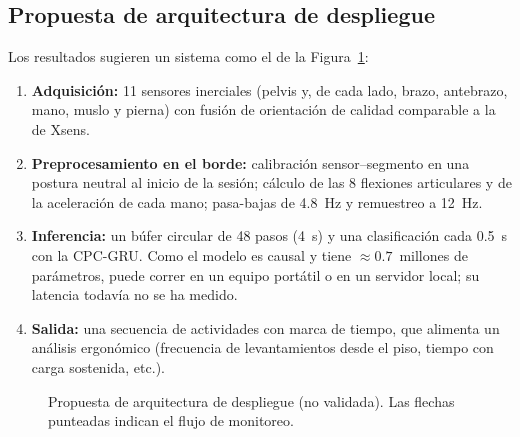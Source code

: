 \documentclass[letterpaper,11pt]{article}
\begin{document}
\subsection{Propuesta de arquitectura de despliegue}
Los resultados sugieren un sistema como el de la Figura~\ref{fig:despliegue}:

\begin{enumerate}
  \item \textbf{Adquisición:} 11 sensores inerciales (pelvis y, de cada lado, brazo, antebrazo, mano, muslo y pierna) con fusión de orientación de calidad comparable a la de Xsens.
  \item \textbf{Preprocesamiento en el borde:} calibración sensor--segmento en una postura neutral al inicio de la sesión; cálculo de las 8 flexiones articulares y de la aceleración de cada mano; pasa-bajas de 4.8~Hz y remuestreo a 12~Hz.
  \item \textbf{Inferencia:} un búfer circular de 48 pasos (4~s) y una clasificación cada 0.5~s con la CPC-GRU. Como el modelo es causal y tiene $\approx 0.7$~millones de parámetros, puede correr en un equipo portátil o en un servidor local; su latencia todavía no se ha medido.
  \item \textbf{Salida:} una secuencia de actividades con marca de tiempo, que alimenta un análisis ergonómico (frecuencia de levantamientos desde el piso, tiempo con carga sostenida, etc.).
\end{enumerate}

\begin{figure}[H]
\centering
{}
\caption{Propuesta de arquitectura de despliegue (no validada). Las flechas punteadas indican el flujo de monitoreo.}
\label{fig:despliegue}
\end{figure}
\end{document}
